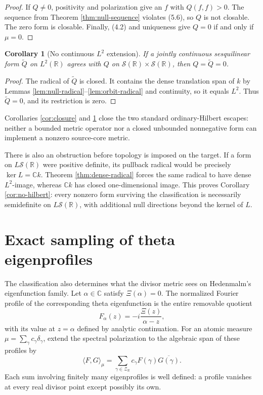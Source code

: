 \documentclass[11pt]{article}
\newtheorem{corollary}[theorem]{Corollary}
\newcommand{\C}{\mathbb C}
\newcommand{\R}{\mathbb R}
\newcommand{\cS}{\mathcal S}
\newcommand{\cZ}{\mathcal Z}
\begin{document}
\begin{proof}
If \(Q\neq0\), positivity and polarization give an \(f\) with \(Q(f,f)>0\).
The sequence from Theorem \ref{thm:null-sequence} violates (5.6), so \(Q\) is not closable.
The zero form is closable.  Finally, (4.2) and uniqueness give \(Q=0\) if and only if
\(\mu=0\).
\end{proof}

\begin{corollary}[No continuous \(L^2\) extension]\label{cor:no-extension}
If a jointly continuous sesquilinear form \(\widetilde Q\) on \(L^2(\R)\) agrees with \(Q\) on
\(\cS(\R)\times\cS(\R)\), then \(Q=\widetilde Q=0\).
\end{corollary}

\begin{proof}
The radical of \(\widetilde Q\) is closed.  It contains the dense translation span of \(k\) by
Lemmas \ref{lem:null-radical}--\ref{lem:orbit-radical} and continuity, so it equals \(L^2\).
Thus \(\widetilde Q=0\), and its restriction is zero.
\end{proof}

Corollaries \ref{cor:closure} and \ref{cor:no-extension} close the two standard ordinary-Hilbert
escapes: neither a bounded metric operator nor a closed unbounded nonnegative form can implement a
nonzero source-core metric.

There is also an obstruction before topology is imposed on the target.  If a form on
\(L\cS(\R)\) were positive definite, its pullback radical would be precisely
\(\ker L=\C k\).  Theorem \ref{thm:dense-radical} forces the same radical to have dense
\(L^2\)-image, whereas \(\C k\) has closed one-dimensional image.  This proves Corollary
\ref{cor:no-hilbert}: every nonzero form surviving the classification is necessarily
semidefinite on \(L\cS(\R)\), with additional null directions beyond the kernel of \(L\).

\section{Exact sampling of theta eigenprofiles}\label{sec:sampling}

The classification also determines what the divisor metric sees on Hedenmalm's
eigenfunction family.  Let \(\alpha\in\C\) satisfy \(\Xi(\alpha)=0\).  The normalized Fourier
profile of the corresponding theta eigenfunction is the entire removable quotient
\[
 F_\alpha(z)=-i\frac{\Xi(z)}{\alpha-z},
\tag{6.1}
\]
with its value at \(z=\alpha\) defined by analytic continuation.  For an atomic measure
\(\mu=\sum_\gamma c_\gamma\delta_\gamma\), extend the spectral polarization to the algebraic
span of these profiles by
\[
 \langle F,G\rangle_\mu
   =\sum_{\gamma\in\cZ_\R}c_\gamma
      F(\gamma)\overline{G(\gamma)}.
\tag{6.2}
\]
Each sum involving finitely many eigenprofiles is well defined: a profile vanishes at every
real divisor point except possibly its own.
\end{document}
